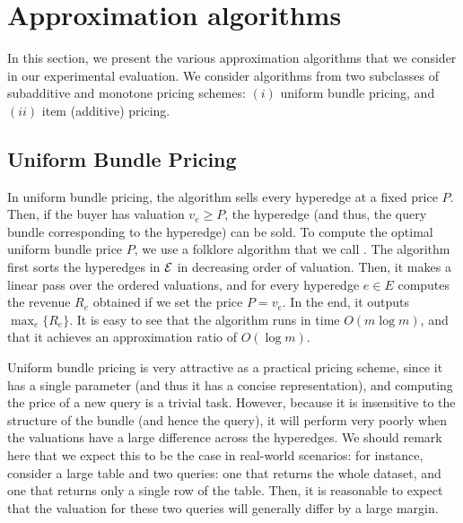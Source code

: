 \section{Approximation algorithms}
\label{section-approxalgo}

In this section, we present the various approximation algorithms that we consider in our experimental evaluation. We consider algorithms from two subclasses of subadditive and monotone pricing schemes: $(i)$ uniform bundle pricing, and $(ii)$ item (additive) pricing.

\subsection{Uniform Bundle Pricing} 
\label{subsection-uniformbundle}

In uniform bundle pricing, the algorithm sells every hyperedge at a fixed price $P$. Then, if the buyer has valuation $v_e \geq P$, the hyperedge (and thus, the query bundle corresponding to the hyperedge) can be sold. 
To compute the optimal uniform bundle price $P$, we use a folklore algorithm that we call \ubp . The algorithm first sorts the hyperedges in $\mathcal{E}$
in decreasing order of valuation. Then, it makes a linear pass over the ordered valuations, and for every hyperedge $e \in E$ computes the revenue $R_e$ obtained
if we set the price $P = v_e$. In the end, it outputs $\max_e \{R_e\}$. It is easy to see that the algorithm runs in time $O(m \log m)$, and that it achieves an approximation
ratio of $O(\log m)$.


Uniform bundle pricing is very attractive as a practical pricing scheme, since it has a single parameter (and thus it has a concise representation), and computing the price of a new query is a trivial task. 
However, because it is insensitive to the structure of the bundle (and hence the query), it will perform very poorly when the valuations have a large difference across the hyperedges. 
We should remark here that we expect this to be the case in real-world scenarios: for instance, consider a large table and two queries: one that returns the whole dataset, and one that returns only a single row of the table. Then, it is reasonable to expect that the valuation for these two queries will generally differ by a large margin. 


